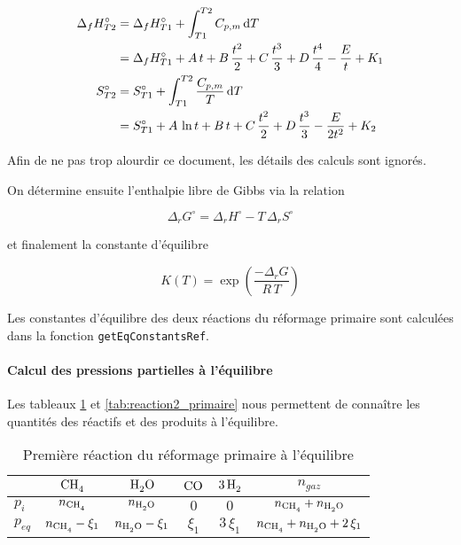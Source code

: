 \documentclass[a4paper, oneside, 12pt]{article}
\begin{document}
\begin{align*}
	\Delta_f H_{T2}^{\circ} &= \Delta_f H_{T1}^{\circ} 
	+ \int_{T1}^{T2} C_{p,m} \, \mathrm{d}T \\ 
				 &= \Delta_f H_{T1}^{\circ} 
	+ A \, t + B \, \frac{t^2}{2}  + C \,  \frac{t^3}{3} 
	+ D \, \frac{t^4}{4} - \frac{E}{t} + K_{1} \\		 
	S_{T2}^{\circ}  &= S_{T1}^{\circ} + \int_{T1}^{T2} 
	\frac{C_{p,m}}{T} \, \mathrm{d}T \\
			&= S_{T1}^{\circ} + A \, \ln{t} 
	+ B \, t + C \, \frac{t^2}{2} 
	+ D \, \frac{t^3}{3} - \frac{E}{2 t^{2}} + K_{2} 
\end{align*}

Afin de ne pas trop alourdir ce document, les détails des calculs sont ignorés. 

On détermine ensuite l'enthalpie libre de Gibbs via la relation 

\begin{equation*}
	\Delta_r G^{\circ} = \Delta_r H^{\circ} 
	- T \, \Delta_r S^{\circ}
\end{equation*}

et finalement la constante d'équilibre 

\[ 
K(T) = \exp{\left(\frac{- \Delta_r G}{R \, T}\right)} 
\]

Les constantes d'équilibre des deux réactions du réformage primaire 
sont calculées dans la fonction \texttt{getEqConstantsRef}.

\paragraph{Calcul des pressions partielles à l'équilibre}

Les tableaux \ref{tab:reaction1_primaire} et \ref{tab:reaction2_primaire} nous 
permettent de conna\^itre les quantités des réactifs et des produits à l'équilibre. 

\begin{table}
	\centering
	\begin{tabular}{l|c|c|c|c|c}
		 & $\ce{CH4}$ & $\ce{H2O}$ & $\ce{CO}$ & $\ce{3H2}$ & $n_{gaz}$ \\
		\hline
		$p_{i}$ & $n_{\ce{CH4}}$ & $n_{\ce{H2O}}$ & $0$ & $0$ &
		$n_{\ce{CH4}} + n_{\ce{H2O}}$ \\
		$p_{eq}$ & $n_{\ce{CH4}} - \xi_1$ & $n_{\ce{H2O}} - \xi_1$ & 
		$\xi_1$ & $3 \, \xi_1$ & $n_{\ce{CH4}} + n_{\ce{H2O}} + 2 \, \xi_1 $\\
	\end{tabular}
	\caption{Première réaction du réformage primaire à l'équilibre}
	\label{tab:reaction1_primaire}
\end{table}
\end{document}
